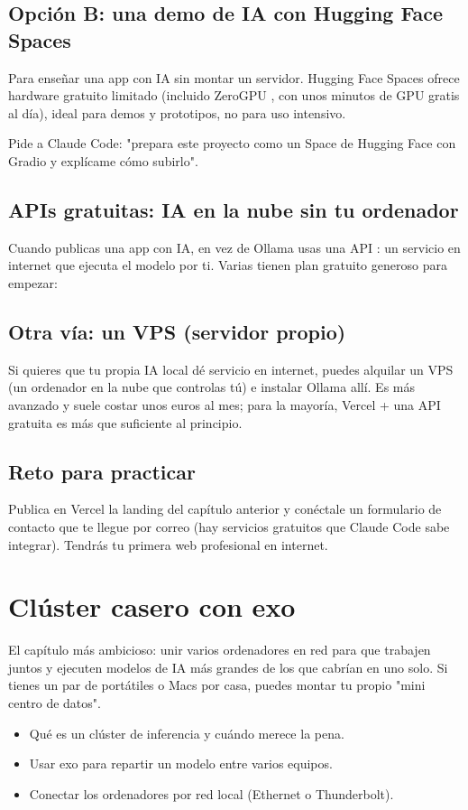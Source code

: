 \documentclass[11pt,a4paper]{book}
\begin{document}
\section{Opción B: una demo de IA con Hugging Face Spaces}
Para enseñar una app con IA sin montar un servidor. Hugging Face Spaces ofrece hardware gratuito limitado (incluido ZeroGPU , con unos minutos de GPU gratis al día), ideal para demos y prototipos, no para uso intensivo.

Pide a Claude Code: "prepara este proyecto como un Space de Hugging Face con Gradio y explícame cómo subirlo".

\section{APIs gratuitas: IA en la nube sin tu ordenador}
Cuando publicas una app con IA, en vez de Ollama usas una API : un servicio en internet que ejecuta el modelo por ti. Varias tienen plan gratuito generoso para empezar:

\section{Otra vía: un VPS (servidor propio)}
Si quieres que tu propia IA local dé servicio en internet, puedes alquilar un VPS (un ordenador en la nube que controlas tú) e instalar Ollama allí. Es más avanzado y suele costar unos euros al mes; para la mayoría, Vercel + una API gratuita es más que suficiente al principio.

\section{Reto para practicar}
Publica en Vercel la landing del capítulo anterior y conéctale un formulario de contacto que te llegue por correo (hay servicios gratuitos que Claude Code sabe integrar). Tendrás tu primera web profesional en internet.

\chapter{Clúster casero con exo}
El capítulo más ambicioso: unir varios ordenadores en red para que trabajen juntos y ejecuten modelos de IA más grandes de los que cabrían en uno solo. Si tienes un par de portátiles o Macs por casa, puedes montar tu propio "mini centro de datos".

\begin{itemize}\item Qué es un clúster de inferencia y cuándo merece la pena.\end{itemize}
\begin{itemize}\item Usar exo para repartir un modelo entre varios equipos.\end{itemize}
\begin{itemize}\item Conectar los ordenadores por red local (Ethernet o Thunderbolt).\end{itemize}
\end{document}
